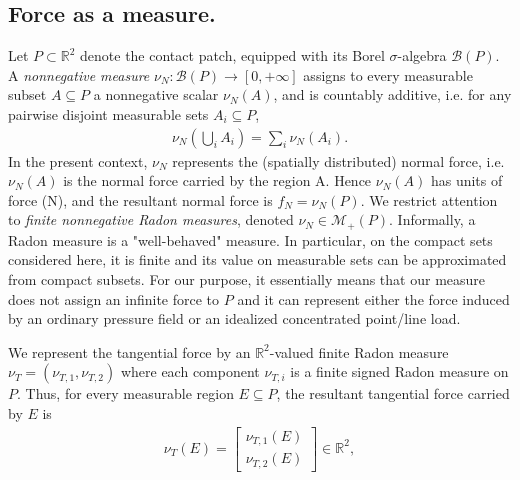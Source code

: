 \documentclass[11pt,a4paper]{article}
\theoremstyle{plain}
\begin{document}
\subsection{Force as a measure.}
Let $P\subset\mathbb R^2$ denote the contact patch, equipped with its Borel
$\sigma$-algebra $\mathcal B(P)$. A \textit{nonnegative measure} $\nu_N:\mathcal B(P)\rightarrow[0,+\infty]$ assigns to every measurable subset $A\subseteq P$ a nonnegative scalar $\nu_N(A)$, and is countably additive, i.e. for any pairwise disjoint measurable sets $A_i \subseteq P$,
\begin{align}
\nu_N\left(\bigcup_i A_i\right) =\sum_i \nu_N(A_i).
\end{align}
In the present context, $\nu_N$ represents the (spatially distributed) normal force, i.e. $\nu_N(A)$ is the normal force carried by the region A. Hence $\nu_N(A)$ has units of force (N), and the resultant normal force is $f_N=\nu_N(P)$. We restrict attention to \textit{finite nonnegative Radon measures}, denoted $\nu_N\in\mathcal M_+(P)$. Informally, a Radon measure is a "well-behaved" measure. In particular, on the compact sets considered here, it is finite and its value on measurable sets can be approximated from compact subsets. For our purpose, it essentially means that our measure does not assign an infinite force to $P$ and it can represent either the force induced by an ordinary pressure field or an idealized concentrated point/line load.

We represent the tangential force by an $\mathbb R^2$-valued finite Radon measure $\nu_T=(\nu_{T,1},\nu_{T,2})$ where each component $\nu_{T,i}$ is a finite signed Radon measure on $P$. Thus, for every measurable region $E\subseteq P$, the resultant tangential force carried by $E$ is
\begin{align}
    \nu_T(E)
    =
    \begin{bmatrix}
    \nu_{T,1}(E)\\
    \nu_{T,2}(E)
    \end{bmatrix}
    \in\mathbb R^2,
\end{align}
\end{document}
